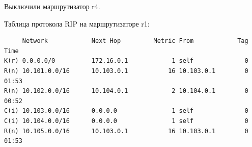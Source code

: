 \documentclass[a4paper,12pt]{article}
\begin{document}
Выключили маршрутизатор r4.

Таблица протокола RIP на маршрутизаторе r1:

\begin{Verbatim}
     Network            Next Hop         Metric From            Tag Time
K(r) 0.0.0.0/0          172.16.0.1            1 self              0
R(n) 10.101.0.0/16      10.103.0.1           16 10.103.0.1        0 01:53
R(n) 10.102.0.0/16      10.104.0.1            2 10.104.0.1        0 00:52
C(i) 10.103.0.0/16      0.0.0.0               1 self              0
C(i) 10.104.0.0/16      0.0.0.0               1 self              0
R(n) 10.105.0.0/16      10.103.0.1           16 10.103.0.1        0 01:53
\end{Verbatim}
\end{document}
